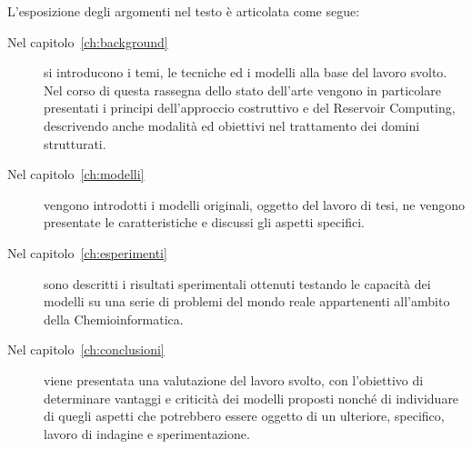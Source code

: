L'esposizione degli argomenti nel testo è articolata come segue:
\begin{description}
\item[Nel capitolo~\ref{ch:background}] si introducono i temi, le tecniche ed i modelli alla base del lavoro svolto. Nel corso di questa rassegna dello stato dell'arte vengono in particolare presentati i principi dell'approccio costruttivo e del Reservoir Computing, descrivendo anche modalità ed obiettivi nel trattamento dei domini strutturati.
\item[Nel capitolo~\ref{ch:modelli}] vengono introdotti i modelli originali, oggetto del lavoro di tesi, ne vengono presentate le caratteristiche e discussi gli aspetti specifici.
\item[Nel capitolo~\ref{ch:esperimenti}] sono descritti i risultati sperimentali ottenuti testando le capacità dei modelli su una serie di problemi del mondo reale appartenenti all'ambito della Chemioinformatica. 
\item[Nel capitolo~\ref{ch:conclusioni}] viene presentata una valutazione del lavoro svolto, con l'obiettivo di determinare vantaggi e criticità dei modelli proposti nonché di individuare di quegli aspetti che potrebbero essere oggetto di un ulteriore, specifico, lavoro di indagine e sperimentazione.
\end{description}

